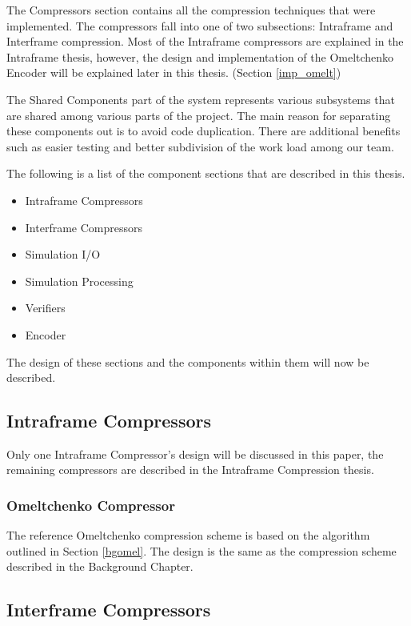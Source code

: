 \documentclass[a4paper,11pt]{report}
\begin{document}
The Compressors section contains all the compression techniques that were implemented. The compressors fall into one of two subsections: Intraframe and Interframe compression. Most of the Intraframe compressors are explained in the Intraframe thesis\cite{kegcomp}, however, the design and implementation of the Omeltchenko Encoder will be explained later in this thesis. (Section \ref{imp_omelt})

The Shared Components part of the system represents various subsystems that are shared among various parts of the project. The main reason for separating these components out is to avoid code duplication. There are additional benefits such as easier testing and better subdivision of the work load among our team.

The following is a list of the component sections that are described in this thesis.
\begin{itemize}
 \item Intraframe Compressors
 \item Interframe Compressors
 \item Simulation I/O
 \item Simulation Processing
 \item Verifiers
 \item Encoder
\end{itemize}

The design of these sections and the components within them will now be described.

\subsection{Intraframe Compressors}

Only one Intraframe Compressor's design will be discussed in this paper, the remaining compressors are described in the Intraframe Compression thesis. 

\subsubsection{Omeltchenko Compressor}

The reference Omeltchenko compression scheme is based on the algorithm outlined in Section \ref{bgomel}. The design is the same as the compression scheme described in the Background Chapter.

\subsection{Interframe Compressors}
\end{document}
